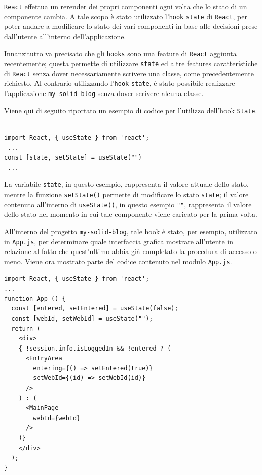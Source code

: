 \bigskip

{\tt React} effettua un rerender dei propri componenti ogni volta che lo stato di un componente cambia. A tale scopo è stato utilizzato l'{\tt hook} {\tt state} di {\tt React}, per poter andare a modificare lo stato dei vari componenti in base alle decisioni prese dall'utente all'interno dell'applicazione.

\bigskip

Innanzitutto va precisato che gli {\tt hooks} sono una feature di {\tt React} aggiunta recentemente; questa permette di utilizzare {\tt state} ed altre features caratteristiche di {\tt React} senza dover necessariamente scrivere una classe, come precedentemente richiesto. Al contrario utilizzando l'{\tt hook} {\tt state}, è stato possibile realizzare l'applicazione {\tt my-solid-blog} senza dover scrivere alcuna classe.

\bigskip

Viene qui di seguito riportato un esempio di codice per l'utilizzo dell'hook {\tt State}.

\medskip

\begin{lstlisting}

import React, { useState } from 'react';
 ... 
const [state, setState] = useState("")
 ... 
\end{lstlisting}

\medskip

La variabile {\tt state}, in questo esempio, rappresenta il valore attuale dello stato, mentre la funzione {\tt setState()} permette di modificare lo stato {\tt state}; il valore contenuto all'interno di {\tt useState()}, in questo esempio {\tt ""}, rappresenta il valore dello stato nel momento in cui tale componente viene caricato per la prima volta.

\bigskip

All'interno del progetto {\tt my-solid-blog}, tale hook è stato, per esempio, utilizzato in {\tt App.js}, per determinare quale interfaccia grafica mostrare all'utente in relazione al fatto che quest'ultimo abbia già completato la procedura di accesso o meno. Viene ora mostrato parte del codice contenuto nel modulo {\tt App.js}.

\medskip

\begin{lstlisting}
import React, { useState } from 'react';
...
function App () {
  const [entered, setEntered] = useState(false);
  const [webId, setWebId] = useState("");
  return (
    <div>
    { !session.info.isLoggedIn && !entered ? (
      <EntryArea
        entering={() => setEntered(true)}
        setWebId={(id) => setWebId(id)}
      />       
    ) : (        
      <MainPage
        webId={webId}
      />
    )}
    </div>
  );
}
\end{lstlisting}

